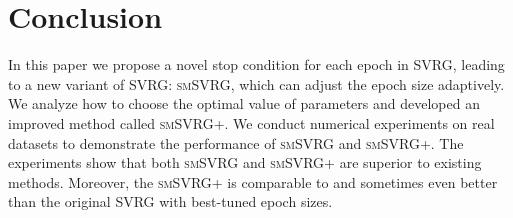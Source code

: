 \documentclass[conference]{IEEEtran}
\begin{document}
\section{Conclusion}
In this paper we propose a novel stop condition for each epoch in SVRG, leading to a new variant of SVRG: \textsc{smSVRG}, which can adjust the epoch size adaptively. We analyze how to choose the optimal value of parameters and developed an improved method called \textsc{smSVRG+}. We conduct numerical experiments on real datasets to demonstrate the performance of \textsc{smSVRG} and \textsc{smSVRG+}. The experiments show that both \textsc{smSVRG} and \textsc{smSVRG+} are superior to existing methods. Moreover, the \textsc{smSVRG+} is comparable to and sometimes even better than the original SVRG with best-tuned epoch sizes.
\label{conclusion}







%
%
%


\newpage




\end{document}
